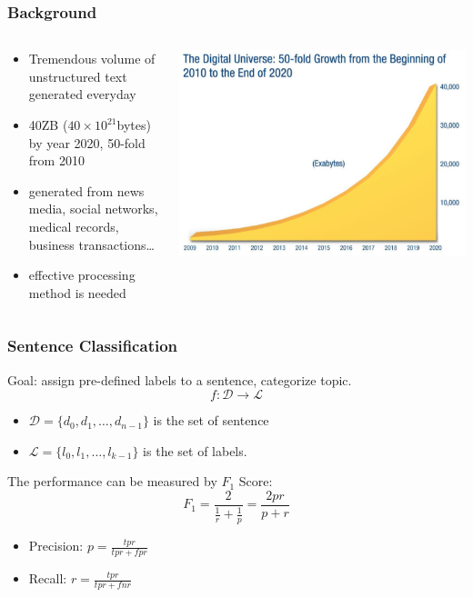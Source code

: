 \documentclass{beamer}
\begin{document}
\begin{frame}
\frametitle{Background}
    \begin{columns}
    \begin{column}{0.5\textwidth}
    \begin{itemize}
        \item Tremendous volume of unstructured text generated everyday
        \item 40ZB ($40\times 10^{21}$bytes) by year 2020, 50-fold from 2010\footnotemark
        \item generated from news media, social networks, medical records, 
            business transactions\ldots
        \item effective processing method is needed
    \end{itemize}
    \end{column}
    \begin{column}{0.5\textwidth}
    \center\includegraphics[width=\textwidth]{figure/data_growth_2020}
    \end{column}
    \end{columns}
\end{frame}

\begin{frame}
\frametitle{Sentence Classification}
    Goal: assign pre-defined labels to a sentence, categorize topic.
    $$f:\mathcal{D}\rightarrow\mathcal{L}$$
    \begin{itemize}
        \item $\mathcal{D}=\{d_0, d_1,\ldots, d_{n-1}\}$ is the set of sentence
        \item $\mathcal{L}=\{l_0, l_1,\ldots, l_{k-1}\}$ is the set of labels.
    \end{itemize}
    The performance can be measured by $F_1$ Score:
    $$F_1=\frac{2}{\frac{1}{r}+\frac{1}{p}}=\frac{2pr}{p+r}$$
    \begin{itemize}
        \item Precision: $p=\frac{tpr}{tpr+fpr}$
        \item Recall: $r=\frac{tpr}{tpr+fnr}$
    \end{itemize}
\end{frame}
\end{document}
